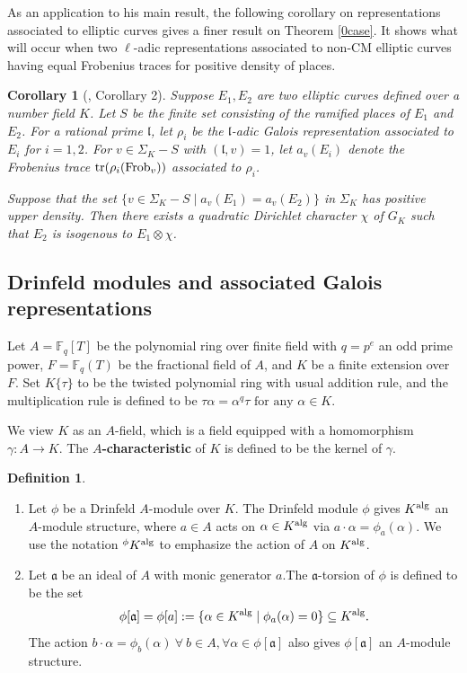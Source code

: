 \documentclass[20pt, oneside]{article}   	%
\newtheorem{cor}[thm]{Corollary}
\theoremstyle{definition}
\newtheorem{defi}[thm]{Definition}
\newcommand{\F}{\mathbb{F}}
\newcommand{\fl}{\mathfrak{l}}
\begin{document}
As an application to his main result, the following corollary on representations associated to elliptic curves gives a finer result on Theorem \ref{0case}. It shows what will occur when two $\ell$-adic representations associated to non-CM elliptic curves having equal Frobenius traces for positive density of places.

\begin{cor}[\cite{Ra98}, Corollary 2]\label{Ra2}
Suppose $E_1, E_2$ are two elliptic curves defined over a number field $K$. Let $S$ be the finite set consisting of the ramified places of $E_1$ and $E_2$. For a rational prime $\fl$, let $\rho_i$ be the $\fl$-adic Galois representation associated to $E_i$ for $i=1,2$. For $v\in\Sigma_K-S$ with $(\fl,v)=1$, let $a_v(E_i)$ denote the Frobenius trace ${\rm tr}(\rho_i({\rm Frob}_v))$ associated to $\rho_i$.  

Suppose that the set $\{v\in\Sigma_K-S\mid a_v(E_1)=a_v(E_2)\}$ in $\Sigma_K$ has positive upper density. Then there exists a quadratic Dirichlet character $\chi$ of $G_K$ such that $E_2$ is isogenous to $E_1\otimes \chi$.



\end{cor}




\subsection{Drinfeld modules and associated Galois representations}
Let $A=\F_q[T]$ be the polynomial ring over finite field with $q=p^e$ an odd prime power, $F=\F_q(T)$ be the fractional field of $A$, and  $K$ be a finite extension over $F$. Set $K\{\tau\}$ to be the twisted polynomial ring with usual addition rule, and the multiplication rule is defined to be $\tau\alpha=\alpha^q\tau \text{ for any } \alpha\in K$.  

We view $K$ as an $A$-field, which is a field equipped with a homomorphism $\gamma: A\rightarrow K$. The {\bf{$A$-characteristic}} of $K$ is defined to be the kernel of $\gamma$.


\begin{defi}
\begin{enumerate}
\item[(i)] Let $\phi$ be a Drinfeld $A$-module over $K$. The Drinfeld module $\phi$ gives $K^{{\rm{alg}}}$ an $A$-module structure, where $a\in A$ acts on $\alpha\in K^{{\rm{alg}}}$ via $a\cdot\alpha=\phi_{a}(\alpha)$. We use the notation $^{\phi}K^{{\rm{alg}}}$ to emphasize the action of $A$ on $K^{{\rm{alg}}}$.


\item[(ii)] Let $\mathfrak{a}$ be an ideal of $A$ with monic generator $a$.The {{$\mathfrak{a}$-torsion}} of $\phi$ is defined to be the set $$\phi[\mathfrak{a}]=\phi[a]:=\{ \alpha\in K^{\rm alg}\mid \phi_a(\alpha)=0 \}\subseteq K^{\rm alg}.$$ The action $b\cdot \alpha=\phi_b(\alpha) \ \forall\ b\in A, \forall \alpha\in\phi[\mathfrak{a}]$ also gives $\phi[\mathfrak{a}]$ an $A$-module structure. 
\end{enumerate}
\end{defi}
\end{document}
